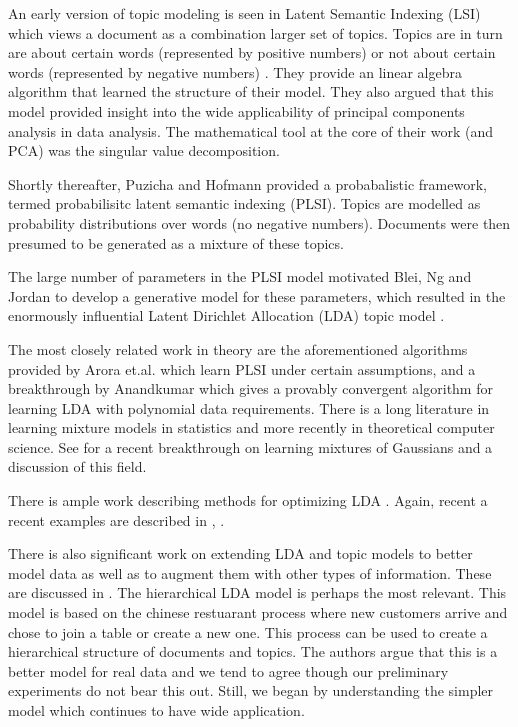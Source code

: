 An early version of topic modeling is seen in Latent Semantic
Indexing (LSI) which views a document as a combination larger
set of topics.  Topics are in turn are about certain words
(represented by positive numbers) or not about certain words
(represented by negative numbers) \cite{Papadimitriou1997}.  They
provide an linear algebra algorithm that learned the structure
of their model.  They also argued that this model provided
insight into the wide applicability of principal
components analysis in data analysis. The mathematical tool at the core
of their work (and PCA) was the singular value
decomposition.

Shortly thereafter, Puzicha and Hofmann \cite{Hofmann04} provided a
probabalistic framework, termed probabilisitc latent
semantic indexing (PLSI). Topics are modelled as probability
distributions over words (no negative numbers). Documents were
then presumed to be generated as a mixture of these
topics. 

The large number of parameters in the PLSI model motivated
Blei, Ng and Jordan to develop a generative model for these parameters,
which resulted in the enormously influential Latent Dirichlet
Allocation (LDA) topic model \cite{Blei2003a}.

The most closely related work in theory are the aforementioned
algorithms provided by Arora et.al. \cite{Arora2012} which learn PLSI
under certain assumptions, and a breakthrough by
Anandkumar\cite{AnandLDA} which gives a provably convergent algorithm
for learning LDA with polynomial data requirements.  There is a long
literature in learning mixture models in statistics and
more recently in theoretical computer science. See
\cite{MoitraValiant} for a recent breakthrough on learning mixtures of
Gaussians and a discussion of this field.

There is ample work describing methods for optimizing
LDA \cite{BleiCACM}.  Again, recent a recent examples are described
in \cite{McCallumMALLET}, \cite{BleiCBA}. 

There is also significant work on extending LDA and topic models to
better model data as well as to augment them with other types of
information.  These are discussed in \cite{BleiCACM}.  The
hierarchical LDA model \cite{BleiCM} is perhaps the most relevant.
This model is based on the chinese restuarant process where new
customers arrive and chose to join a table or create a new one.  This
process can be used to create a hierarchical structure of documents
and topics. The authors argue that this is a better model for real
data and we tend to agree though our preliminary experiments do not
bear this out.  Still, we began by understanding the simpler model
which continues to have wide application.  

